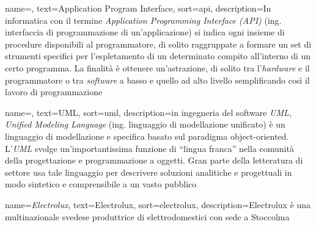 




	
\renewcommand{\glossaryname}{Glossario}

{
	name=,
	text=Application Program Interface,
	sort=api,
	description={In informatica con il termine \emph{Application Programming Interface (API)} (ing. interfaccia di programmazione di un'applicazione) si indica ogni insieme di procedure disponibili al programmatore, di solito raggruppate a formare un set di strumenti specifici per l'espletamento di un determinato compito all'interno di un certo programma. La finalità è ottenere un'astrazione, di solito tra l'\emph{hardware} e il programmatore o tra \emph{software} a basso e quello ad alto livello semplificando così il lavoro di programmazione}
}

{
	name=,
	text=UML,
	sort=uml,
	description={in ingegneria del software \emph{UML, Unified Modeling Language} (ing. linguaggio di modellazione unificato) è un linguaggio di modellazione e specifica basato sul paradigma object-oriented. L'\emph{UML} svolge un'importantissima funzione di ``lingua franca'' nella comunità della progettazione e programmazione a oggetti. Gran parte della letteratura di settore usa tale linguaggio per descrivere soluzioni analitiche e progettuali in modo sintetico e comprensibile a un vasto pubblico}
}

{
	name={\textit{Electrolux}},
	text=Electrolux,
	sort=electrolux,
	description={Electrolux è una multinazionale svedese produttrice di elettrodomestici con sede a Stoccolma}
}

